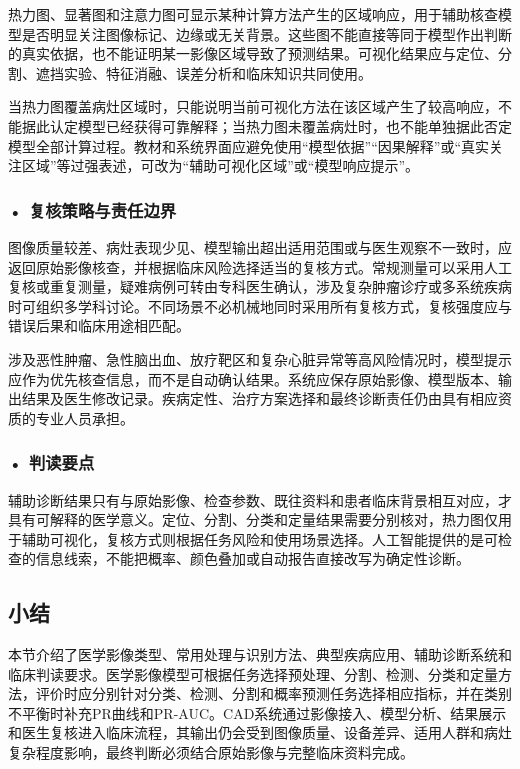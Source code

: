 热力图、显著图和注意力图可显示某种计算方法产生的区域响应，用于辅助核查模型是否明显关注图像标记、边缘或无关背景。这些图不能直接等同于模型作出判断的真实依据，也不能证明某一影像区域导致了预测结果。可视化结果应与定位、分割、遮挡实验、特征消融、误差分析和临床知识共同使用。

当热力图覆盖病灶区域时，只能说明当前可视化方法在该区域产生了较高响应，不能据此认定模型已经获得可靠解释；当热力图未覆盖病灶时，也不能单独据此否定模型全部计算过程。教材和系统界面应避免使用“模型依据”“因果解释”或“真实关注区域”等过强表述，可改为“辅助可视化区域”或“模型响应提示”。

\subsubsection*{\textbf{• 复核策略与责任边界}}

图像质量较差、病灶表现少见、模型输出超出适用范围或与医生观察不一致时，应返回原始影像核查，并根据临床风险选择适当的复核方式。常规测量可以采用人工复核或重复测量，疑难病例可转由专科医生确认，涉及复杂肿瘤诊疗或多系统疾病时可组织多学科讨论。不同场景不必机械地同时采用所有复核方式，复核强度应与错误后果和临床用途相匹配。

涉及恶性肿瘤、急性脑出血、放疗靶区和复杂心脏异常等高风险情况时，模型提示应作为优先核查信息，而不是自动确认结果。系统应保存原始影像、模型版本、输出结果及医生修改记录。疾病定性、治疗方案选择和最终诊断责任仍由具有相应资质的专业人员承担。

\subsubsection*{\textbf{• 判读要点}}

辅助诊断结果只有与原始影像、检查参数、既往资料和患者临床背景相互对应，才具有可解释的医学意义。定位、分割、分类和定量结果需要分别核对，热力图仅用于辅助可视化，复核方式则根据任务风险和使用场景选择。人工智能提供的是可检查的信息线索，不能把概率、颜色叠加或自动报告直接改写为确定性诊断。

\subsection*{小结}

本节介绍了医学影像类型、常用处理与识别方法、典型疾病应用、辅助诊断系统和临床判读要求。医学影像模型可根据任务选择预处理、分割、检测、分类和定量方法，评价时应分别针对分类、检测、分割和概率预测任务选择相应指标，并在类别不平衡时补充PR曲线和PR-AUC。CAD系统通过影像接入、模型分析、结果展示和医生复核进入临床流程，其输出仍会受到图像质量、设备差异、适用人群和病灶复杂程度影响，最终判断必须结合原始影像与完整临床资料完成。

